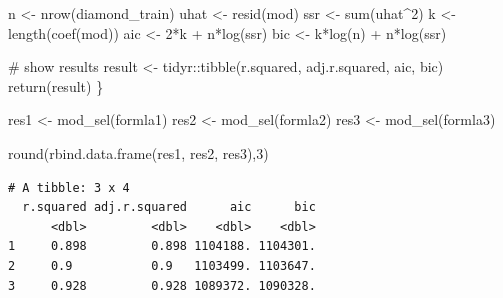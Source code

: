 \documentclass[
  letterpaper,
  DIV=11,
  numbers=noendperiod]{scrreprt}
\newenvironment{Shaded}{\begin{snugshade}}{\end{snugshade}}
\newcommand{\CommentTok}[1]{\textcolor[rgb]{0.37,0.37,0.37}{#1}}
\newcommand{\DecValTok}[1]{\textcolor[rgb]{0.68,0.00,0.00}{#1}}
\newcommand{\FunctionTok}[1]{\textcolor[rgb]{0.28,0.35,0.67}{#1}}
\newcommand{\NormalTok}[1]{\textcolor[rgb]{0.00,0.23,0.31}{#1}}
\newcommand{\OtherTok}[1]{\textcolor[rgb]{0.00,0.23,0.31}{#1}}
\newcommand{\SpecialCharTok}[1]{\textcolor[rgb]{0.37,0.37,0.37}{#1}}
\begin{document}
\begin{Shaded}
\begin{Highlighting}[]
\NormalTok{  n }\OtherTok{\textless{}{-}} \FunctionTok{nrow}\NormalTok{(diamond\_train)}
\NormalTok{  uhat }\OtherTok{\textless{}{-}} \FunctionTok{resid}\NormalTok{(mod)}
\NormalTok{  ssr }\OtherTok{\textless{}{-}} \FunctionTok{sum}\NormalTok{(uhat}\SpecialCharTok{\^{}}\DecValTok{2}\NormalTok{)}
\NormalTok{  k }\OtherTok{\textless{}{-}} \FunctionTok{length}\NormalTok{(}\FunctionTok{coef}\NormalTok{(mod))}
\NormalTok{  aic }\OtherTok{\textless{}{-}} \DecValTok{2}\SpecialCharTok{*}\NormalTok{k }\SpecialCharTok{+}\NormalTok{ n}\SpecialCharTok{*}\FunctionTok{log}\NormalTok{(ssr)}
\NormalTok{  bic }\OtherTok{\textless{}{-}}\NormalTok{ k}\SpecialCharTok{*}\FunctionTok{log}\NormalTok{(n) }\SpecialCharTok{+}\NormalTok{ n}\SpecialCharTok{*}\FunctionTok{log}\NormalTok{(ssr)}

  \CommentTok{\# show results}
\NormalTok{  result }\OtherTok{\textless{}{-}}\NormalTok{ tidyr}\SpecialCharTok{::}\FunctionTok{tibble}\NormalTok{(r.squared, adj.r.squared, aic, bic)}
  \FunctionTok{return}\NormalTok{(result)}
\NormalTok{\}}

\NormalTok{res1 }\OtherTok{\textless{}{-}} \FunctionTok{mod\_sel}\NormalTok{(formla1)}
\NormalTok{res2 }\OtherTok{\textless{}{-}} \FunctionTok{mod\_sel}\NormalTok{(formla2)}
\NormalTok{res3 }\OtherTok{\textless{}{-}} \FunctionTok{mod\_sel}\NormalTok{(formla3)}

\FunctionTok{round}\NormalTok{(}\FunctionTok{rbind.data.frame}\NormalTok{(res1, res2, res3),}\DecValTok{3}\NormalTok{)}
\end{Highlighting}
\end{Shaded}

\begin{verbatim}
# A tibble: 3 x 4
  r.squared adj.r.squared      aic      bic
      <dbl>         <dbl>    <dbl>    <dbl>
1     0.898         0.898 1104188. 1104301.
2     0.9           0.9   1103499. 1103647.
3     0.928         0.928 1089372. 1090328.
\end{verbatim}
\end{document}
